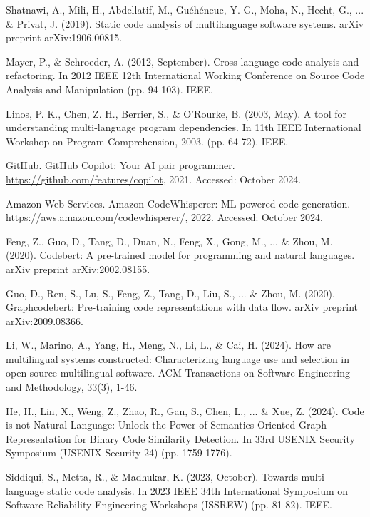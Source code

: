 \documentclass{article}
\begin{document}
\small
\begin{thebibliography}{00}

Shatnawi, A., Mili, H., Abdellatif, M., Guéhéneuc, Y. G., Moha, N., Hecht, G., ... \& Privat, J. (2019). Static code analysis of multilanguage software systems. arXiv preprint arXiv:1906.00815.

Mayer, P., \& Schroeder, A. (2012, September). Cross-language code analysis and refactoring. In 2012 IEEE 12th International Working Conference on Source Code Analysis and Manipulation (pp. 94-103). IEEE.

Linos, P. K., Chen, Z. H., Berrier, S., \& O'Rourke, B. (2003, May). A tool for understanding multi-language program dependencies. In 11th IEEE International Workshop on Program Comprehension, 2003. (pp. 64-72). IEEE.

GitHub.
\newblock GitHub Copilot: Your AI pair programmer.
\newblock \url{https://github.com/features/copilot}, 2021.
\newblock Accessed: October 2024.

Amazon Web Services.
\newblock Amazon CodeWhisperer: ML-powered code generation.
\newblock \url{https://aws.amazon.com/codewhisperer/}, 2022.
\newblock Accessed: October 2024.

Feng, Z., Guo, D., Tang, D., Duan, N., Feng, X., Gong, M., ... \& Zhou, M. (2020). Codebert: A pre-trained model for programming and natural languages. arXiv preprint arXiv:2002.08155.

Guo, D., Ren, S., Lu, S., Feng, Z., Tang, D., Liu, S., ... \& Zhou, M. (2020). Graphcodebert: Pre-training code representations with data flow. arXiv preprint arXiv:2009.08366.

Li, W., Marino, A., Yang, H., Meng, N., Li, L., \& Cai, H. (2024). How are multilingual systems constructed: Characterizing language use and selection in open-source multilingual software. ACM Transactions on Software Engineering and Methodology, 33(3), 1-46.

He, H., Lin, X., Weng, Z., Zhao, R., Gan, S., Chen, L., ... \& Xue, Z. (2024). Code is not Natural Language: Unlock the Power of {Semantics-Oriented} Graph Representation for Binary Code Similarity Detection. In 33rd USENIX Security Symposium (USENIX Security 24) (pp. 1759-1776).

Siddiqui, S., Metta, R., \& Madhukar, K. (2023, October). Towards multi-language static code analysis. In 2023 IEEE 34th International Symposium on Software Reliability Engineering Workshops (ISSREW) (pp. 81-82). IEEE.


\end{thebibliography}
\end{document}

